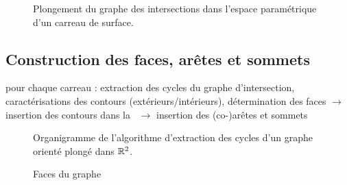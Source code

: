 \begin{figure}
	\centering
	\caption{Plongement du graphe des intersections dans l'espace paramétrique d'un carreau de surface.}
\end{figure}


\subsection{Construction des faces, arêtes et sommets \brep}
pour chaque carreau : extraction des cycles du graphe d'intersection, caractérisations des contours (extérieurs/intérieurs), détermination des faces $\to$ insertion des contours dans la \brep\ $\to$ insertion des (co-)arêtes et sommets
\begin{figure}
	\centering
	
	\caption{Organigramme de l'algorithme d'extraction des cycles d'un graphe orienté plongé dans $\mathbb{R}^2$.}
\end{figure}


\begin{figure}
	\centering
	
	\caption{Faces du graphe}
\end{figure}